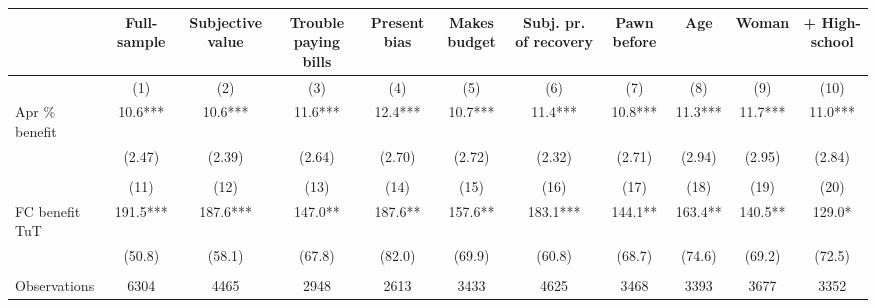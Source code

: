 \begin{tabular}{lcccccccccc}
\toprule
      & Full-sample & Subjective value & Trouble paying bills & Present bias & Makes budget & Subj. pr. of recovery & Pawn before & Age   & Woman & + High-school \\
\midrule
      & (1)   & (2)   & (3)   & (4)   & (5)   & (6)   & (7)   & (8)   & (9)   & (10) \\
\midrule
\midrule
Apr \% benefit & 10.6*** & 10.6*** & 11.6*** & 12.4*** & 10.7*** & 11.4*** & 10.8*** & 11.3*** & 11.7*** & 11.0*** \\
      & (2.47) & (2.39) & (2.64) & (2.70) & (2.72) & (2.32) & (2.71) & (2.94) & (2.95) & (2.84) \\
      &       &       &       &       &       &       &       &       &       &  \\
\midrule
      & (11)  & (12)  & (13)  & (14)  & (15)  & (16)  & (17)  & (18)  & (19)  & (20) \\
\midrule
\midrule
FC benefit TuT & 191.5*** & 187.6*** & 147.0** & 187.6** & 157.6** & 183.1*** & 144.1** & 163.4** & 140.5** & 129.0* \\
      & (50.8) & (58.1) & (67.8) & (82.0) & (69.9) & (60.8) & (68.7) & (74.6) & (69.2) & (72.5) \\
      &       &       &       &       &       &       &       &       &       &  \\
\midrule
Observations & 6304  & 4465  & 2948  & 2613  & 3433  & 4625  & 3468  & 3393  & 3677  & 3352 \\
\bottomrule
\bottomrule
\end{tabular}%
